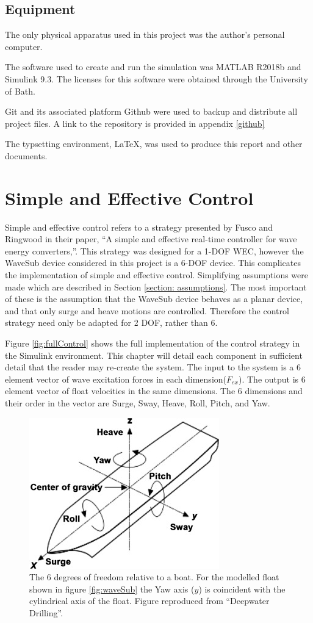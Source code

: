 \documentclass{report}
\begin{document}
\section{Equipment}
The only physical apparatus used in this project was the author's personal computer.

The software used to create and run the simulation was MATLAB R2018b and Simulink 9.3. The licenses for this software were obtained through the University of Bath.

Git and its associated platform Github were used to backup and distribute all project files. A link to the repository is provided in appendix \ref{github}

The typsetting environment, \LaTeX , was used to produce this report and other documents.
\chapter{Simple and Effective Control}
Simple and effective control refers to a strategy presented by Fusco and Ringwood in their paper, ``A simple and effective real-time controller for wave energy converters,''\cite{ringwood}. This strategy was designed for a 1-DOF WEC, however the WaveSub device considered in this project is a 6-DOF device. This complicates the implementation of simple and effective control. Simplifying assumptions were made which are described in Section \ref{section: assumptions}. The most important of these is the assumption that the WaveSub device behaves as a planar device, and that only surge and heave motions are controlled. Therefore the control strategy need only be adapted for 2 DOF, rather than 6.

Figure \ref{fig:fullControl} shows the full implementation of the control strategy in the Simulink environment. This chapter will detail each component in sufficient detail that the reader may re-create the system. The input to the system is a 6 element vector of wave excitation forces in each dimension($F_{ex}$). The output is 6 element vector of float velocities in the same dimensions. The 6 dimensions and their order in the vector are Surge, Sway, Heave, Roll, Pitch, and Yaw.

\begin{figure}[b]
\includegraphics{graphics/dimensionsPic}
\centering
\caption{The 6 degrees of freedom relative to a boat. For the modelled float shown in figure \ref{fig:waveSub} the Yaw axis ($y$) is coincident with the cylindrical axis of the float. Figure reproduced from ``Deepwater Drilling''\cite{dimensionsPic}.}
\label{dimensionsPic}
\end{figure}
\end{document}
